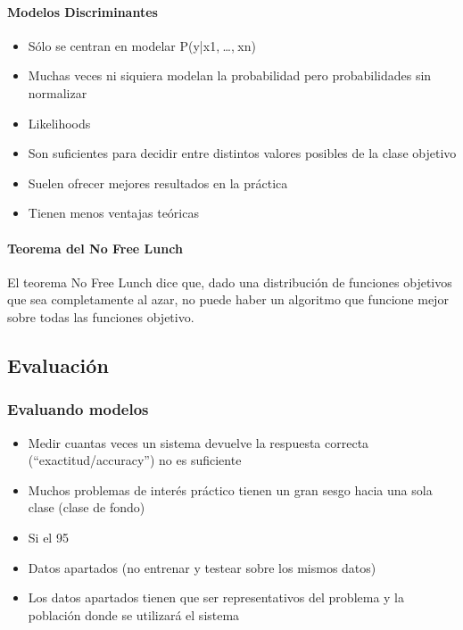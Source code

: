 \documentclass[a4paper,12pt,spanish]{book}
\begin{document}
	\paragraph{Modelos Discriminantes}
	  \begin{itemize}
	    \item Sólo se centran en modelar P(y|x1, …, xn)
	    \item Muchas veces ni siquiera modelan la probabilidad pero probabilidades sin normalizar
	    \item Likelihoods
	    \item Son suficientes para decidir entre distintos valores posibles de la clase objetivo
	    \item Suelen ofrecer mejores resultados en la práctica
	    \item Tienen menos ventajas teóricas
	  \end{itemize}

	\paragraph{Teorema del No Free Lunch}
	  El teorema No Free Lunch dice que, dado una distribución de funciones objetivos que sea completamente al azar, no puede haber un algoritmo que funcione mejor sobre todas las funciones objetivo.

      \subsection{Evaluación}

	\subsubsection {Evaluando modelos}
	  \begin{itemize}
	    \item Medir cuantas veces un sistema devuelve la respuesta correcta (“exactitud/accuracy”) no es suficiente
	    \item Muchos problemas de interés práctico tienen un gran sesgo hacia una sola clase (clase de fondo)
	    \item Si el 95%
	    \item Datos apartados (no entrenar y testear sobre los mismos datos)
	    \item Los datos apartados tienen que ser representativos del problema y la población donde se utilizará el sistema
	  \end{itemize}
\end{document}
